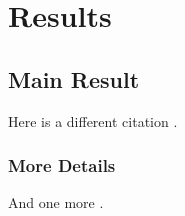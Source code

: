 \chapter{Results}

\section{Main Result}
Here is a different citation .  

\subsection{More Details}

And one more .
